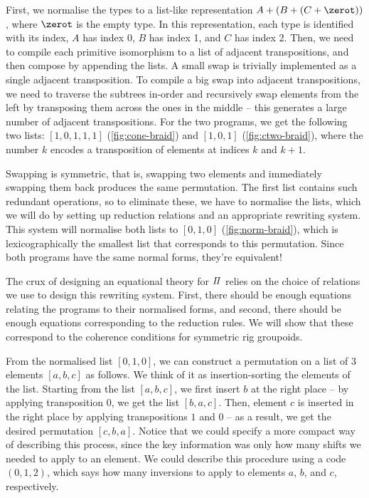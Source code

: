 First, we normalise the types to a list-like representation $A + (B + (C + \zerot))$, where $\zerot$ is the empty type.
In this representation, each type is identified with its index, $A$ has index 0, $B$ has index 1, and $C$ has index 2.
Then, we need to compile each primitive isomorphism to a list of adjacent transpositions, and then compose by appending
the lists. A small swap is trivially implemented as a single adjacent transposition. To compile a big swap into adjacent
transpositions, we need to traverse the subtrees in-order and recursively swap elements from the left by transposing
them across the ones in the middle -- this generates a large number of adjacent transpositions. For the two programs, we
get the following two lists: $[1,0,1,1,1]$ (\cref{fig:cone-braid}) and $[1,0,1]$ (\cref{fig:ctwo-braid}), where the
number $k$ encodes a transposition of elements at indices $k$ and $k+1$.

Swapping is symmetric, that is, swapping two elements and immediately swapping them back produces the same permutation.
The first list contains such redundant operations, so to eliminate these, we have to normalise the lists, which we will
do by setting up reduction relations and an appropriate rewriting system. This system will normalise both lists to
$[0,1,0]$ (\cref{fig:norm-braid}), which is lexicographically the smallest list that corresponds to this permutation.
Since both programs have the same normal forms, they're equivalent!

The crux of designing an equational theory for $\mathit{\Pi}$ relies on the choice of relations we use to design this
rewriting system. First, there should be enough equations relating the programs to their normalised forms, and second,
there should be enough equations corresponding to the reduction rules. We will show that these correspond to the
coherence conditions for symmetric rig groupoids.

From the normalised list $[0,1,0]$, we can construct a permutation on a list of 3 elements $[a,b,c]$ as follows. We think
of it as insertion-sorting the elements of the list. Starting from the list $[a, b, c]$, we first insert $b$ at the
right place -- by applying transposition $0$, we get the list $[b, a, c]$. Then, element $c$ is inserted in the right
place by applying transpositions $1$ and $0$ -- as a result, we get the desired permutation $[c, b, a]$. Notice that we
could specify a more compact way of describing this process, since the key information was only how many shifts we
needed to apply to an element. We could describe this procedure using a code $(0, 1, 2)$, which says how many inversions
to apply to elements $a$, $b$, and $c$, respectively.


